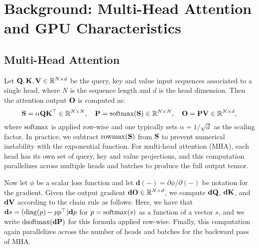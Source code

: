 \section{Background: Multi-Head Attention and GPU Characteristics}
\label{sec:background}

\subsection{Multi-Head Attention}
\label{subsec:multi_head_attn}

Let $\mathbf{Q}, \mathbf{K}, \mathbf{V} \in \mathbb{R}^{N \times d}$ be the query, key and value input sequences associated to a single head, where $N$ is the sequence length and $d$ is the head dimension. Then the attention output $\mathbf{O}$ is computed as:
\begin{equation*}
  \mathbf{S} = \alpha \mathbf{Q} \mathbf{K}^\top \in \mathbb{R}^{N \times N}, \quad \mathbf{P} = \mathrm{softmax}(\mathbf{S}) \in \mathbb{R}^{N \times N}, \quad \mathbf{O} = \mathbf{P}\mathbf{V} \in \mathbb{R}^{N \times d},
\end{equation*}
where $\mathrm{softmax}$ is applied row-wise and one typically sets $\alpha = 1/\sqrt{d}$ as the scaling factor.
In practice, we subtract $\mathrm{rowmax}(\mathbf{S})$ from $\mathbf{S}$ to prevent numerical instability with the exponential function.
For multi-head attention (MHA), each head has its own set of query, key and value projections, and this computation parallelizes across multiple heads and batches to produce the full output tensor.

Now let $\phi$ be a scalar loss function and let $\mathbf{d}(-) = \partial \phi / \partial (-)$ be notation for the gradient.
Given the output gradient $\mathbf{dO} \in \mathbb{R}^{N \times d}$, we compute $\mathbf{dQ}$, $\mathbf{dK}$, and $\mathbf{dV}$ according to the chain rule as follows:
\iftoggle{arxiv}{
\begin{align*}
  \vdV &= \vP^\top \vdO \in \mathbb{R}^{N \times d} \\
  \vdP &= \vdO \vV^\top \in \mathbb{R}^{N \times N} \\
  \vdS &= \dsoftmax (\vdP) \in \mathbb{R}^{N \times N} \\
  \vdQ &= \alpha \vdS \vK \in \mathbb{R}^{N \times d} \\
  \vdK &= \alpha \vdS^\top \vQ \in \mathbb{R}^{N \times d},
\end{align*}
}{
\begin{align*}
  \vdV &= \vP^\top \vdO \in \mathbb{R}^{N \times d}, \: &\vdP &= \vdO \vV^\top \in \mathbb{R}^{N \times N}, \\
  \vdS &= \dsoftmax (\vdP) \in \mathbb{R}^{N \times N}, \: &\vdQ &= \alpha \vdS \vK \in \mathbb{R}^{N \times d}, \qquad \vdK = \alpha \vdS^\top \vQ \in \mathbb{R}^{N \times d}.
\end{align*}
}
Here, we have that $\mathbf{d}s = (\mathrm{diag}(p) - p p^\top)\mathbf{d}p$ for $p = \mathrm{softmax}(s)$ as a function of a vector $s$, and we write $\mathrm{dsoftmax}(\mathbf{dP})$ for this formula applied row-wise.
Finally, this computation again parallelizes across the number of heads and batches for the backward pass of MHA.

